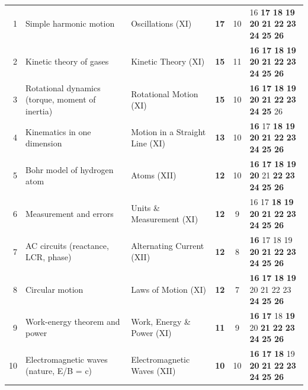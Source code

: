 {\begin{tabularx}{\linewidth}{@{}r@{\hspace{6pt}}>{\raggedright\arraybackslash}Xlcc@{\hspace{6pt}}l@{}}
1 & Simple harmonic motion & Oscillations (XI) & \textbf{17} & 10 & {\scriptsize {\color{gray!45}16} \textbf{17} \textbf{18} \textbf{19} \textbf{20} \textbf{21} \textbf{22} \textbf{23} \textbf{24} \textbf{25} \textbf{26}}\\
2 & Kinetic theory of gases & Kinetic Theory (XI) & \textbf{15} & 11 & {\scriptsize \textbf{16} \textbf{17} \textbf{18} \textbf{19} \textbf{20} \textbf{21} \textbf{22} \textbf{23} \textbf{24} \textbf{25} \textbf{26}}\\
3 & Rotational dynamics (torque, moment of inertia) & Rotational Motion (XI) & \textbf{15} & 10 & {\scriptsize \textbf{16} \textbf{17} \textbf{18} \textbf{19} \textbf{20} \textbf{21} \textbf{22} \textbf{23} \textbf{24} \textbf{25} {\color{gray!45}26}}\\
4 & Kinematics in one dimension & Motion in a Straight Line (XI) & \textbf{13} & 10 & {\scriptsize \textbf{16} {\color{gray!45}17} \textbf{18} \textbf{19} \textbf{20} \textbf{21} \textbf{22} \textbf{23} \textbf{24} \textbf{25} \textbf{26}}\\
5 & Bohr model of hydrogen atom & Atoms (XII) & \textbf{12} & 10 & {\scriptsize \textbf{16} \textbf{17} \textbf{18} \textbf{19} \textbf{20} {\color{gray!45}21} \textbf{22} \textbf{23} \textbf{24} \textbf{25} \textbf{26}}\\
6 & Measurement and errors & Units \& Measurement (XI) & \textbf{12} & 9 & {\scriptsize {\color{gray!45}16} {\color{gray!45}17} \textbf{18} \textbf{19} \textbf{20} \textbf{21} \textbf{22} \textbf{23} \textbf{24} \textbf{25} \textbf{26}}\\
7 & AC circuits (reactance, LCR, phase) & Alternating Current (XII) & \textbf{12} & 8 & {\scriptsize \textbf{16} {\color{gray!45}17} {\color{gray!45}18} {\color{gray!45}19} \textbf{20} \textbf{21} \textbf{22} \textbf{23} \textbf{24} \textbf{25} \textbf{26}}\\
8 & Circular motion & Laws of Motion (XI) & \textbf{12} & 7 & {\scriptsize \textbf{16} \textbf{17} \textbf{18} \textbf{19} {\color{gray!45}20} {\color{gray!45}21} {\color{gray!45}22} {\color{gray!45}23} \textbf{24} \textbf{25} \textbf{26}}\\
9 & Work-energy theorem and power & Work, Energy \& Power (XI) & \textbf{11} & 9 & {\scriptsize \textbf{16} \textbf{17} {\color{gray!45}18} \textbf{19} {\color{gray!45}20} \textbf{21} \textbf{22} \textbf{23} \textbf{24} \textbf{25} \textbf{26}}\\
10 & Electromagnetic waves (nature, E/B = c) & Electromagnetic Waves (XII) & \textbf{10} & 10 & {\scriptsize \textbf{16} \textbf{17} \textbf{18} {\color{gray!45}19} \textbf{20} \textbf{21} \textbf{22} \textbf{23} \textbf{24} \textbf{25} \textbf{26}}\\

\end{tabularx}}
